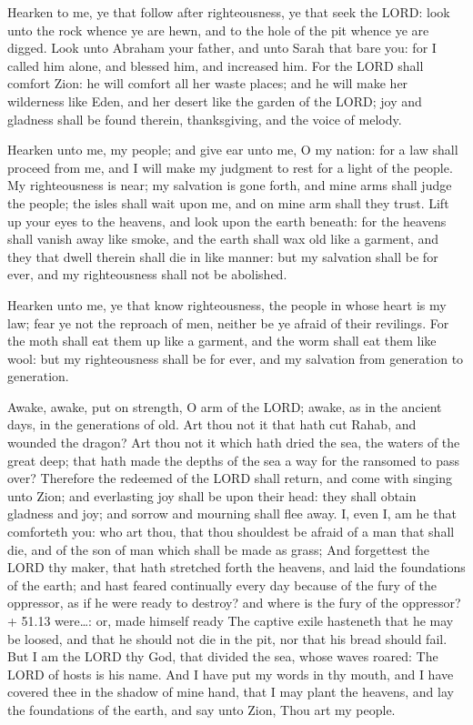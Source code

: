  Hearken to me, ye that follow after righteousness, ye that
seek the LORD: look unto the rock whence ye are hewn, and to the hole of
the pit whence ye are digged.  Look unto Abraham your
father, and unto Sarah that bare you: for I called him alone, and
blessed him, and increased him.  For the LORD shall comfort
Zion: he will comfort all her waste places; and he will make her
wilderness like Eden, and her desert like the garden of the LORD; joy
and gladness shall be found therein, thanksgiving, and the voice of
melody.

 Hearken unto me, my people; and give ear unto me, O my
nation: for a law shall proceed from me, and I will make my judgment to
rest for a light of the people.  My righteousness is near;
my salvation is gone forth, and mine arms shall judge the people; the
isles shall wait upon me, and on mine arm shall they trust. 
Lift up your eyes to the heavens, and look upon the earth beneath: for
the heavens shall vanish away like smoke, and the earth shall wax old
like a garment, and they that dwell therein shall die in like manner:
but my salvation shall be for ever, and my righteousness shall not be
abolished.

 Hearken unto me, ye that know righteousness, the people
in whose heart is my law; fear ye not the reproach of men, neither be ye
afraid of their revilings.  For the moth shall eat them up
like a garment, and the worm shall eat them like wool: but my
righteousness shall be for ever, and my salvation from generation to
generation.

 Awake, awake, put on strength, O arm of the LORD; awake,
as in the ancient days, in the generations of old. Art thou not it that
hath cut Rahab, and wounded the dragon?  Art thou not it
which hath dried the sea, the waters of the great deep; that hath made
the depths of the sea a way for the ransomed to pass over? 
Therefore the redeemed of the LORD shall return, and come with singing
unto Zion; and everlasting joy shall be upon their head: they shall
obtain gladness and joy; and sorrow and mourning shall flee away.
 I, even I, am he that comforteth you: who art thou, that
thou shouldest be afraid of a man that shall die, and of the son of man
which shall be made as grass;  And forgettest the LORD thy
maker, that hath stretched forth the heavens, and laid the foundations
of the earth; and hast feared continually every day because of the fury
of the oppressor, as if he were ready to destroy? and where is the fury
of the oppressor?+ 51.13 were\ldots: or, made himself ready
 The captive exile hasteneth that he may be loosed, and
that he should not die in the pit, nor that his bread should fail.
 But I am the LORD thy God, that divided the sea, whose
waves roared: The LORD of hosts is his name.  And I have
put my words in thy mouth, and I have covered thee in the shadow of mine
hand, that I may plant the heavens, and lay the foundations of the
earth, and say unto Zion, Thou art my people.

